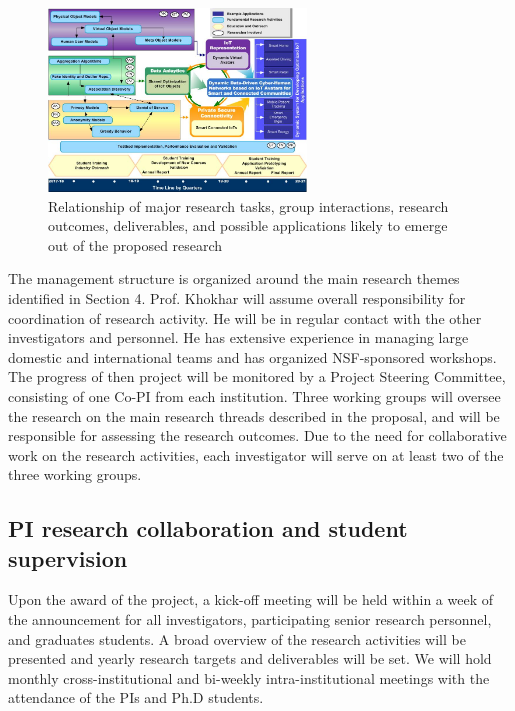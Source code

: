 \begin{figure} \vspace{-3mm}
	\centerline{\includegraphics[width=0.61\textwidth]{./Timeline-v1.jpg}}
	\vspace{-3mm} \caption{Relationship of major research tasks, group interactions, research outcomes, deliverables, and possible applications likely to emerge out of the proposed research}
	\label{CM-1}
	\vspace{-3mm}
\end{figure}

The management structure is organized around the main research themes identified in Section 4.  Prof. Khokhar will assume overall responsibility for coordination of research activity. He will be in regular contact with the other investigators and personnel. He has extensive experience in managing large domestic and international teams and has organized NSF-sponsored workshops. The progress of then project will be monitored by a Project Steering Committee, consisting of one Co-PI from each institution. Three working groups will oversee the research on the main research threads described in the proposal, and will be responsible for assessing the research outcomes. Due to the need for collaborative work on the research activities, each investigator will serve on at least two of the three working groups.


\subsection{PI research collaboration and student supervision} 
Upon the award of the project, a kick-off meeting will be held within a week of the announcement for all investigators, participating senior research personnel, and graduates students. A broad overview of the research activities will be presented and yearly research targets and deliverables will be set. We will hold monthly cross-institutional and bi-weekly intra-institutional meetings with the attendance of the PIs and Ph.D students. 

